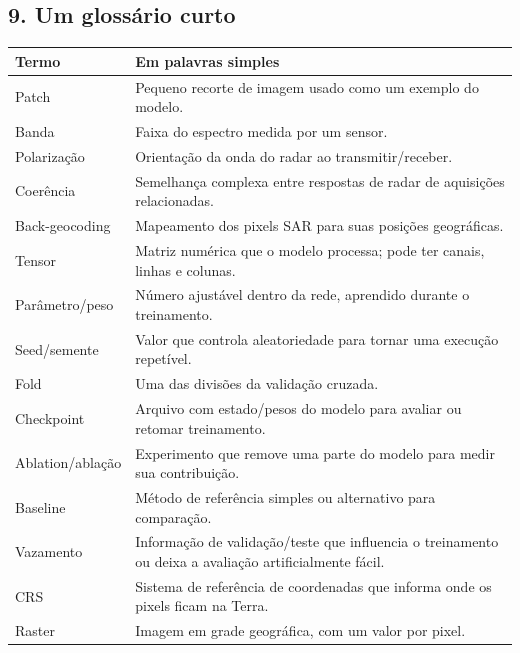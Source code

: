 \documentclass[11pt,a4paper]{article}
\begin{document}
\subsection{9. Um glossário curto}
\begin{center}\small\begin{tabularx}{\textwidth}{|X|X|}\hline
Termo & Em palavras simples \\ \hline
Patch & Pequeno recorte de imagem usado como um exemplo do modelo. \\ \hline
Banda & Faixa do espectro medida por um sensor. \\ \hline
Polarização & Orientação da onda do radar ao transmitir/receber. \\ \hline
Coerência & Semelhança complexa entre respostas de radar de aquisições relacionadas. \\ \hline
Back-geocoding & Mapeamento dos pixels SAR para suas posições geográficas. \\ \hline
Tensor & Matriz numérica que o modelo processa; pode ter canais, linhas e colunas. \\ \hline
Parâmetro/peso & Número ajustável dentro da rede, aprendido durante o treinamento. \\ \hline
Seed/semente & Valor que controla aleatoriedade para tornar uma execução repetível. \\ \hline
Fold & Uma das divisões da validação cruzada. \\ \hline
Checkpoint & Arquivo com estado/pesos do modelo para avaliar ou retomar treinamento. \\ \hline
Ablation/ablação & Experimento que remove uma parte do modelo para medir sua contribuição. \\ \hline
Baseline & Método de referência simples ou alternativo para comparação. \\ \hline
Vazamento & Informação de validação/teste que influencia o treinamento ou deixa a avaliação artificialmente fácil. \\ \hline
CRS & Sistema de referência de coordenadas que informa onde os pixels ficam na Terra. \\ \hline
Raster & Imagem em grade geográfica, com um valor por pixel. \\ \hline
\end{tabularx}\end{center}
\end{document}
